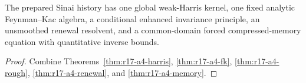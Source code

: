 \begin{theorem}
\label{thm:r17-a4-main}
The prepared Sinai history has one global weak-Harris kernel, one fixed
analytic Feynman--Kac algebra, a conditional enhanced invariance principle, an
unsmoothed renewal resolvent, and a common-domain forced compressed-memory
equation with quantitative inverse bounds.
\end{theorem}

\begin{proof}
Combine Theorems~\ref{thm:r17-a4-harris},
\ref{thm:r17-a4-fk}, \ref{thm:r17-a4-rough},
\ref{thm:r17-a4-renewal}, and \ref{thm:r17-a4-memory}.
\end{proof}
